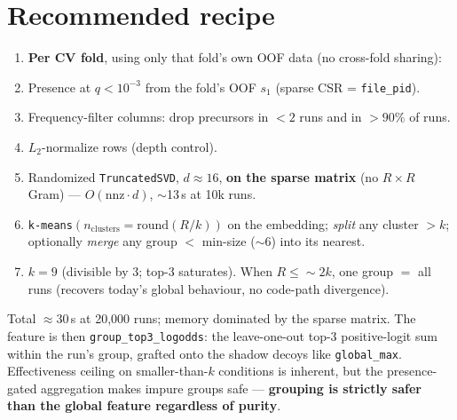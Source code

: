 \documentclass[11pt]{article}
\newcommand{\code}[1]{\texttt{\small #1}}
\begin{document}
\section{Recommended recipe}
\begin{enumerate}[nosep]
  \item \textbf{Per CV fold}, using only that fold's own OOF data (no cross-fold sharing):
  \item Presence at $q<10^{-3}$ from the fold's OOF $s_1$ (sparse CSR = \code{file\_pid}).
  \item Frequency-filter columns: drop precursors in $<2$ runs and in $>90\%$ of runs.
  \item $L_2$-normalize rows (depth control).
  \item Randomized \code{TruncatedSVD}, $d\approx16$, \textbf{on the sparse matrix} (no $R\times R$
  Gram) --- $O(\text{nnz}\cdot d)$, $\sim$13\,s at 10k runs.
  \item \code{k-means}$(n_{\text{clusters}}=\text{round}(R/k))$ on the embedding; \emph{split} any
  cluster $>k$; optionally \emph{merge} any group $<$ min-size ($\sim$6) into its nearest.
  \item $k=9$ (divisible by 3; top-3 saturates). When $R\le\sim2k$, one group $=$ all runs (recovers
  today's global behaviour, no code-path divergence).
\end{enumerate}
Total $\approx$30\,s at 20{,}000 runs; memory dominated by the sparse matrix. The feature is then
\code{group\_top3\_logodds}: the leave-one-out top-3 positive-logit sum within the run's group,
grafted onto the shadow decoys like \code{global\_max}. Effectiveness ceiling on
smaller-than-$k$ conditions is inherent, but the presence-gated aggregation makes impure groups safe
--- \textbf{grouping is strictly safer than the global feature regardless of purity}.
\end{document}

